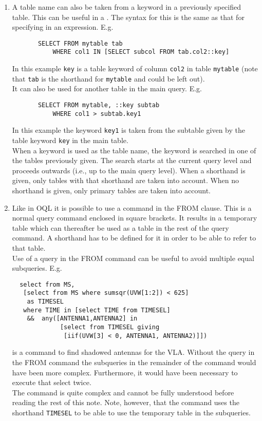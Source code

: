 \begin{description}
\begin{enumerate}
       \item
       A table name can also be taken from a keyword in a previously
       specified table. This can be useful in a
       . The syntax for this is
       the same as that for specifying 
       in an expression. E.g.
       \begin{verbatim}
       SELECT FROM mytable tab
           WHERE col1 IN [SELECT subcol FROM tab.col2::key]
       \end{verbatim}
       In this example \texttt{key} is a table keyword of column
       \texttt{col2} in table \texttt{mytable} (note that \texttt{tab}
       is the shorthand for \texttt{mytable} and could be left out).
       \\It can also be used for another table in the main query. E.g.
       \begin{verbatim}
       SELECT FROM mytable, ::key subtab
           WHERE col1 > subtab.key1
       \end{verbatim}
       In this example the keyword \texttt{key1} is taken from the
       subtable given by the table keyword \texttt{key} in the main
       table.
       \\When a keyword is used as the table name, the keyword is
       searched
       in one of the tables previously given. The search starts at
       the current query level and proceeds outwards (i.e., up to the
       main query level). When a shorthand is given, only tables with
       that shorthand are taken into account. When no shorthand is
       given, only primary tables are taken into account.

       \item
       Like in OQL it is possible to use a
       command in the FROM clause. This is a normal query command
       enclosed in square brackets. It results in a temporary table
       which can thereafter be used as a table in the rest of the
       query command. A shorthand has to be defined for it in order
       to be able to refer to that table.
       \\Use of a query in the FROM command can be useful to avoid
       multiple equal subqueries. E.g.
       \begin{verbatim}
  select from MS,
   [select from MS where sumsqr(UVW[1:2]) < 625]
    as TIMESEL
   where TIME in [select TIME from TIMESEL]
    &&  any([ANTENNA1,ANTENNA2] in
             [select from TIMESEL giving
              [iif(UVW[3] < 0, ANTENNA1, ANTENNA2)]])
       \end{verbatim}
       is a command to find shadowed antennas for the VLA.
       Without the query in the FROM command the subqueries in the
       remainder of the command would have been more complex.
       Furthermore, it would have been necessary to execute that
       select twice.
       \\The command is quite complex and cannot be fully understood
       before reading the rest of this note.
       Note, however, that the command uses the shorthand \texttt{TIMESEL}
       to be able to use the temporary table in the subqueries.


\end{enumerate}
\end{description}
